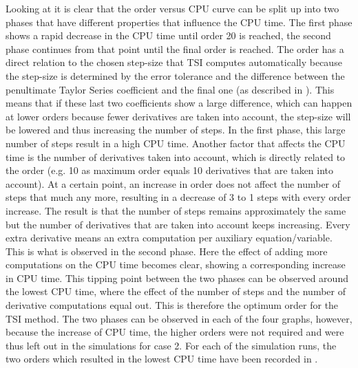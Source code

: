 \noindent
Looking at  it is clear that the order versus CPU curve can be split up into two phases that have different properties that influence the CPU time. The first phase shows a rapid decrease in the CPU time until order 20 is reached, the second phase continues from that point until the final order is reached. The order has a direct relation to the chosen step-size that \ac{TSI} computes automatically because the step-size is determined by the error tolerance and the difference between the penultimate Taylor Series coefficient and the final one (as described in ). This means that if these last two coefficients show a large difference, which can happen at lower orders because fewer derivatives are taken into account, the step-size will be lowered and thus increasing the number of steps. In the first phase, this large number of steps result in a high CPU time. Another factor that affects the CPU time is the number of derivatives taken into account, which is directly related to the order (e.g. 10 as maximum order equals 10 derivatives that are taken into account). At a certain point, an increase in order does not affect the number of steps that much any more, resulting in a decrease of 3 to 1 steps with every order increase. The result is that the number of steps remains approximately the same but the number of derivatives that are taken into account keeps increasing. Every extra derivative means an extra computation per auxiliary equation/variable. This is what is observed in the second phase. Here the effect of adding more computations on the CPU time becomes clear, showing a corresponding increase in CPU time. This tipping point between the two phases can be observed around the lowest CPU time, where the effect of the number of steps and the number of derivative computations equal out. This is therefore the optimum order for the \ac{TSI} method. The two phases can be observed in each of the four graphs, however, because the increase of CPU time, the higher orders were not required and were thus left out in the simulations for case 2. For each of the simulation runs, the two orders which resulted in the lowest CPU time have been recorded in . 

